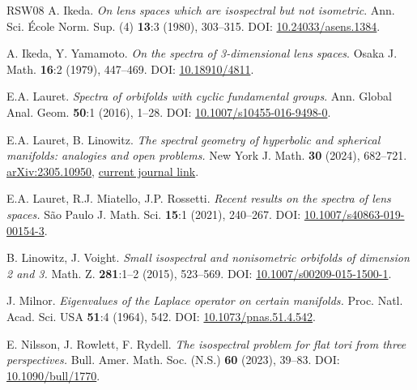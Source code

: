 \documentclass[12pt,a4paper,final]{amsart}
\theoremstyle{plain}
\theoremstyle{definition}
\theoremstyle{remark}
\numberwithin{equation}{section}
\begin{document}
\begin{thebibliography}{RSW08}
    {\sc A. Ikeda}.
    {\it On lens spaces which are isospectral but not isometric}.
    Ann. Sci. \'Ecole Norm. Sup. (4) \textbf{13}:3 (1980), 303--315.
    DOI: \href{http://dx.doi.org/10.24033/asens.1384} {10.24033/asens.1384}.	
    
    {\sc A. Ikeda, Y. Yamamoto}.
    {\it On the spectra of 3-dimensional lens spaces}.
    Osaka J. Math. \textbf{16}:2 (1979), 447--469.
    DOI: \href{http://dx.doi.org/10.18910/4811} {10.18910/4811}.
    
    {\sc E.A. Lauret}.
    {\it Spectra of orbifolds with cyclic fundamental groups}.
    Ann. Global Anal. Geom. \textbf{50}:1 (2016), 1--28.
    DOI: \href{http://dx.doi.org/10.1007/s10455-016-9498-0} {10.1007/s10455-016-9498-0}.
       
    {\sc E.A. Lauret, B. Linowitz}.
    {\it The spectral geometry of hyperbolic and spherical manifolds: analogies and open problems.}
    New York J. Math. \textbf{30} (2024), 682--721.
    \href{https://arxiv.org/abs/2305.10950}{arXiv:2305.10950}, \href{https://nyjm.albany.edu/j/2024/30-31.html}{current journal link}.
    
    {\sc E.A. Lauret, R.J. Miatello, J.P. Rossetti}.
    {\it Recent results on the spectra of lens spaces.}
    S\~ao Paulo J. Math. Sci. \textbf{15}:1 (2021), 240--267.
    DOI: \href{http://dx.doi.org/10.1007/s40863-019-00154-3} {10.1007/s40863-019-00154-3}.
    
    {\sc B. {Linowitz}, J. {Voight}}.
    {\it {Small isospectral and nonisometric orbifolds of dimension 2 and 3.}}
    Math. Z. \textbf{281}:1--2 (2015), 523--569.
    DOI: \href{http://dx.doi.org/10.1007/s00209-015-1500-1} {10.1007/s00209-015-1500-1}.
    
    {\sc J. Milnor}.
    {\it Eigenvalues of the Laplace operator on certain manifolds.}
    Proc. Natl. Acad. Sci. USA \textbf{51}:4 (1964), 542.
    DOI: \href{http://dx.doi.org/10.1073/pnas.51.4.542}{10.1073/pnas.51.4.542}.
    
    {\sc E. Nilsson, J. Rowlett, F. Rydell}.
    {\it The isospectral problem for flat tori from three perspectives.}
    Bull. Amer. Math. Soc. (N.S.) \textbf{60} (2023), 39--83.
    DOI: \href{http://dx.doi.org/10.1090/bull/1770} {10.1090/bull/1770}.
    

\end{thebibliography}
\end{document}
